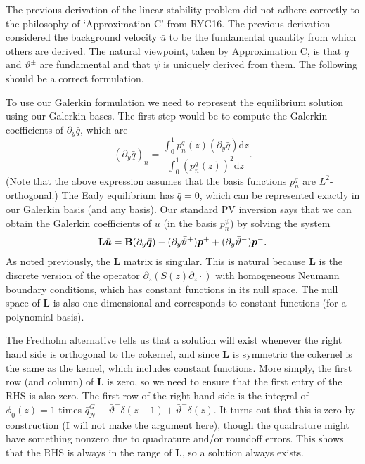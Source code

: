 \documentclass[10pt]{article}
\newcommand{\pd}[1]{\partial_{#1}}
\newcommand{\sN}{\mathcal{N}}
\newcommand{\mat}[1]{\text{\bf #1}}
\begin{document}
The previous derivation of the linear stability problem did not adhere correctly to the philosophy of `Approximation C' from RYG16.
The previous derivation considered the background velocity $\bar u$ to be the fundamental quantity from which others are derived.
The natural viewpoint, taken by Approximation C, is that $q$ and $\vartheta^\pm$ are fundamental and that $\psi$ is uniquely derived from them.
The following should be a correct formulation.

To use our Galerkin formulation we need to represent the equilibrium solution using our Galerkin bases.
The first step would be to compute the Galerkin coefficients of $\pd{y}\bar q$, which are 
\begin{equation}
(\pd{y}\bar q)_n = \frac{\int_0^1 p_n^q(z)(\pd{y}\bar q)\text{d}z}{\int_0^1 (p_n^q(z))^2\text{d}z}.
\end{equation}
(Note that the above expression assumes that the basis functions $p_n^q$ are $L^2$-orthogonal.)
The Eady equilibrium has $\bar q=0$, which can be represented exactly in our Galerkin basis (and any basis).
Our standard PV inversion says that we can obtain the Galerkin coefficients of $\bar u$ (in the basis $p_n^\psi$) by solving the system
\begin{equation}
\mat{L}\bar{\bm{u}} =\mat{B}(\pd{y}\bar{\bm{q}}) -(\pd{y}\bar{\vartheta}^+)\bm{p}^++(\pd{y}\bar{\vartheta}^-)\bm{p}^-.
\end{equation}
As noted previously, the {\bf L} matrix is singular.
This is natural because {\bf L} is the discrete version of the operator $\pd{z}(S(z)\pd{z}\cdot)$ with homogeneous Neumann boundary conditions, which has constant functions in its null space.
The null space of {\bf L} is also one-dimensional and corresponds to constant functions (for a polynomial basis).

The Fredholm alternative tells us that a solution will exist whenever the right hand side is orthogonal to the cokernel, and since {\bf L} is symmetric the cokernel is the same as the kernel, which includes constant functions.
More simply, the first row (and column) of {\bf L} is zero, so we need to ensure that the first entry of the RHS is also zero.
The first row of the right hand side is the integral of $\phi_0(z) = 1$ times $\bar q_\sN^G - \bar\vartheta^+\delta(z-1)+\bar\vartheta^-\delta(z)$.
It turns out that this is zero by construction (I will not make the argument here), though the quadrature might have something nonzero due to quadrature and/or roundoff errors.
This shows that the RHS is always in the range of {\bf L}, so a solution always exists.
\end{document}
